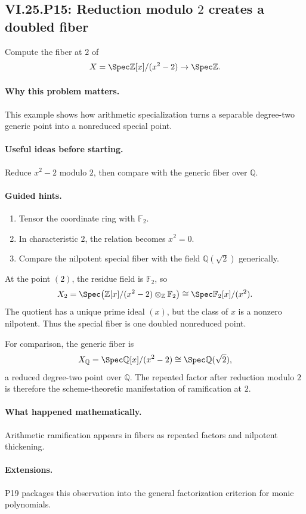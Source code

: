 \subsection*{VI.25.P15: Reduction modulo \(2\) creates a doubled fiber}
\begin{problem}\label{prob:vi25-p15}
Compute the fiber at \(2\) of
\[
X=\Spec\mathbb Z[x]/(x^2-2)\to\Spec\mathbb Z.
\]
\end{problem}

\ifdefined\FullProblemDossiers
\paragraph{Why this problem matters.}
This example shows how arithmetic specialization turns a separable degree-two generic point into a nonreduced special point.

\paragraph{Useful ideas before starting.}
Reduce \(x^2-2\) modulo \(2\), then compare with the generic fiber over \(\mathbb Q\).

\paragraph{Guided hints.}
\begin{enumerate}
\item Tensor the coordinate ring with \(\mathbb F_2\).
\item In characteristic \(2\), the relation becomes \(x^2=0\).
\item Compare the nilpotent special fiber with the field \(\mathbb Q(\sqrt2)\) generically.
\end{enumerate}

\begin{solution}
At the point \((2)\), the residue field is \(\mathbb F_2\), so
\[
X_2
=
\Spec\!\left(
\mathbb Z[x]/(x^2-2)\otimes_{\mathbb Z}\mathbb F_2
\right)
\cong
\Spec\mathbb F_2[x]/(x^2).
\]
The quotient has a unique prime ideal \((x)\), but the class of \(x\) is a nonzero nilpotent.  Thus the special fiber is one doubled nonreduced point.

For comparison, the generic fiber is
\[
X_{\mathbb Q}
=
\Spec\mathbb Q[x]/(x^2-2)
\cong
\Spec\mathbb Q(\sqrt2),
\]
a reduced degree-two point over \(\mathbb Q\).  The repeated factor after reduction modulo \(2\) is therefore the scheme-theoretic manifestation of ramification at \(2\).
\end{solution}

\paragraph{What happened mathematically.}
Arithmetic ramification appears in fibers as repeated factors and nilpotent thickening.

\paragraph{Extensions.}
P19 packages this observation into the general factorization criterion for monic polynomials.
\fi
